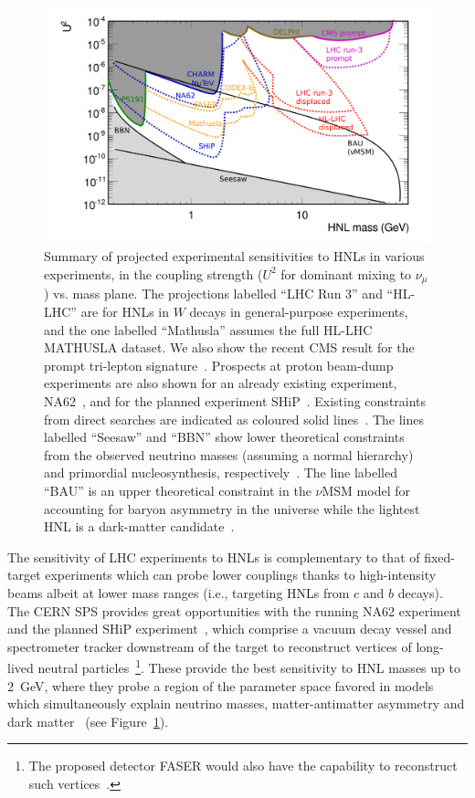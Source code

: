 \begin{figure}[th]
\centering
\includegraphics[width=0.99\linewidth]{plots/BigPicture.pdf}
\caption{Summary of projected experimental sensitivities to HNLs in various experiments, in the coupling strength ($U^2$ for dominant mixing to $\nu_\mu$) vs. mass plane. The projections labelled ``LHC Run 3'' and ``HL-LHC'' are for HNLs in $W$ decays in general-purpose experiments, and the one labelled ``Mathusla'' assumes the full HL-LHC MATHUSLA dataset. We also show the recent CMS result for the prompt tri-lepton signature~\cite{Sirunyan:2018mtv}. Prospects at proton beam-dump experiments are also shown for an already existing experiment, NA62~\cite{Lanfranchi2017}, and for the planned experiment SHiP~\cite{SHiP2015}. Existing constraints from direct searches are indicated as coloured solid lines~\cite{Bernardi1988,CHARM1986,NuTeV1999,Delphi1997,CMS2015b}. The lines labelled ``Seesaw'' and ``BBN'' show lower theoretical constraints from the observed neutrino masses (assuming a normal hierarchy) and primordial nucleosynthesis, respectively~\cite{Canetti2013b}. The line labelled ``BAU'' is an upper theoretical constraint in the $\nu$MSM model for accounting for baryon asymmetry in the universe while the lightest HNL is a dark-matter candidate~\cite{Canetti2013b}.}
\label{fig:HNLsensitivity}
\end{figure}

The sensitivity of LHC experiments to HNLs is complementary to that of fixed-target experiments which can probe lower couplings thanks to high-intensity beams albeit at lower mass ranges (i.e., targeting HNLs from $c$ and $b$ decays). The CERN SPS provides great opportunities with the running NA62 experiment~\cite{NA622017a} and the planned SHiP experiment~\cite{SHiP2015}, which comprise a vacuum decay vessel and spectrometer tracker downstream of the target to reconstruct vertices of long-lived neutral particles~\footnote{The proposed detector FASER would also have the capability to reconstruct such vertices~\cite{Kling:2018wct}.}. These provide the best sensitivity to HNL masses up to 2~GeV, where they probe a region of the parameter space favored in models which simultaneously explain neutrino masses, matter-antimatter asymmetry and dark matter~\cite{Asaka2005b,Canetti2013b,Mermod2017b,Drewes:2017zyw} (see Figure~\ref{fig:HNLsensitivity}).


